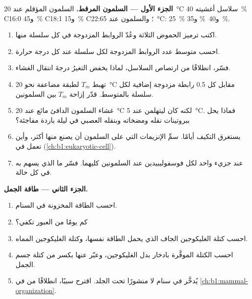 \begin{problem}
\medskip
\noindent\textbf{الجزء الأول --- السلمون المرقط.}
السلمون المؤقلم عند \qty{20}{\celsius} سلاسل أغشيته \qty{40}{\%}
C16:0 و\qty{45}{\%} C18:1 و\qty{15}{\%} C22:6؛ والسلمون عند
\qty{5}{\celsius}: \qty{25}{\%} و\qty{40}{\%} و\qty{35}{\%}.
\begin{enumerate}
  \item اكتب ترميز الحموض الثلاثة وعُدّ الروابط المزدوجة في كل
        سلسلة منها.
  \item احسب متوسط عدد الروابط المزدوجة لكل سلسلة عند كل درجة حرارة.
  \item فسّر، انطلاقًا من ارتصاص السلاسل، لماذا يخفض التغيرُ درجةَ
        انتقال الغشاء.
  \item تهبط $T_m$ لطبقة مضاعفة نحو \qty{20}{\celsius} مقابل كل
        \qty{0.5}{} رابطة مزدوجة إضافية لكل سلسلة بالمتوسط. قدّر
        إزاحة $T_m$ بين السلمونين.
  \item غشاء السلمون الدافئ مائع عند \qty{20}{\celsius} لكنه كان
        ليتهلمن عند \qty{5}{\celsius}. فماذا يحل ببروتينات نقله
        ومضخاته وبنقله العصبي في ليلة باردة مفاجئة؟
  \item يستغرق التكيف أيامًا. سمِّ الإنزيمات التي على السلمون أن
        يصنع منها أكثر، وأين تعمل في  (\cref{ch:b1:eukaryotic-cell}).
  \item {} عند جزيء واحد لكل فوسفوليبيدين عند السلمونين
        كليهما. فسّر ما الذي يسهم به في كل حالة.
\end{enumerate}

\medskip
\noindent\textbf{الجزء الثاني --- طاقة الجمل.}
\begin{enumerate}[resume]
  \item احسب الطاقة المخزونة في السنام.
  \item كم يومًا من العبور تكفي؟
  \item احسب كتلة الغليكوجين الجاف الذي يحمل الطاقة نفسها، وكتلة
        الغليكوجين المماه.
  \item احسب الكتلة الموفَّرة بادخار  بدل الغليكوجين، وعبّر عنها
        بكسر من كتلة جسم الجمل.
  \item يُدخَّر  في سنام لا منشورًا تحت الجلد. اقترح سببًا،
        انطلاقًا من  في
        \cref{ch:b1:mammal-organization}.
\end{enumerate}


\end{problem}
